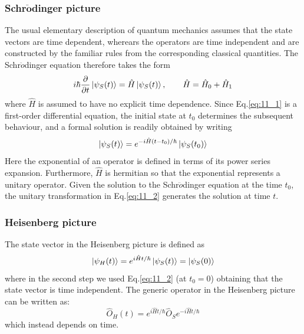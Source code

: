 \documentclass[../main/main.tex]{subfiles}
\begin{document}
\subsubsection{Schr$\pmb{\ddot{o}}$dinger picture}
The usual elementary description of quantum mechanics assumes that the state vectors are time dependent, wherears the operators are time independent and are constructed by the familiar rules from the corresponding classical quantities. The Schr$\ddot{o}$dinger equation therefore takes the form
\begin{equation}
  i \hbar \pdv{}{t} \ket{\psi _S (t)} = \hat{H}  \ket{\psi _S (t)}, \qquad \hat{H} = \hat{H}_0 + \hat{H}_1
  \label{eq:11_1}
\end{equation}
where \( \hat{H}  \) is assumed to have no explicit time dependence.
Since Eq.\eqref{eq:11_1} is a first-order differential equation, the initial state at \( t_0 \) determines the subsequent behaviour, and a formal solution is readily obtained by writing
\begin{equation}
  \ket{\psi _S (t)} = e^{-i \hat{H} (t-t_0)/\hbar  } \ket{\psi _S (t_0)}
  \label{eq:11_2}
\end{equation}
Here the exponential of an operator is defined in terms of its power series expansion. Furthermore, \( \hat{H}  \) is hermitian so that the exponential represents a unitary operator. Given the solution to the Schr$\ddot{o}$dinger equation at the time \( t_0 \), the unitary transformation in Eq.\eqref{eq:11_2} generates the solution at time \( t \).

\subsubsection{Heisenberg picture}
The state vector in the Heisenberg picture is defined as
\begin{equation}
  \ket{\psi _H (t)} = e^{i \hat{H} t/\hbar  } \ket{\psi _S (t)}
  = \ket{\psi _S (0)}
\end{equation}
where in the second step we used Eq.\eqref{eq:11_2} (at \( t_0=0 \)) obtaining that the state vector is time independent. The generic operator in the Heisenberg picture can be written as:
\begin{equation}
  \hat{O}_H (t) = e^{i \hat{H}t/\hbar  } \hat{O}_S  e^{-i \hat{H}t/\hbar  }
\end{equation}
which instead depends on time.
\end{document}
